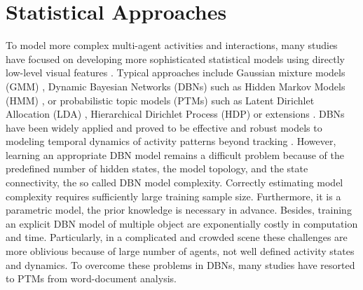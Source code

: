 \section{Statistical Approaches}
\label{related:statistical approaches}

To model more complex multi-agent activities and interactions, many studies have focused on developing more sophisticated statistical models using directly low-level visual features \cite{ zhong2004detecting, duong2005activity, benezeth2009abnormal, kuettel2010s, hospedales2011identifying, saleemi2010scene, wang2009unsupervised, hospedales2012video}. 
Typical approaches include Gaussian mixture models (GMM) \cite{saleemi2010scene}, Dynamic Bayesian Networks (DBNs) \cite{swears2014complex, vo2014stochastic} such as Hidden Markov Models (HMM) \cite{banerjee2014pose}, or probabilistic topic models (PTMs) \cite{kinoshita2014traffic} such as Latent Dirichlet Allocation (LDA) \cite{blei2003latent}, Hierarchical Dirichlet Process (HDP) \cite{teh2006hdp} or extensions \cite{wang2009unsupervised, hospedales2009markov, kuettel2010s}. 
DBNs have been widely applied and proved to be effective and robust models to modeling temporal dynamics of activity patterns beyond tracking \cite{xiang2006beyond, duong2005activity, banerjee2014pose}. However, learning an appropriate DBN model remains a difficult problem because of the predefined number of hidden states, the model topology, and the state connectivity, the so called DBN model complexity. Correctly estimating model complexity requires sufficiently large training sample size. Furthermore, it is a parametric model, the prior knowledge is necessary in advance. %
Besides, training an explicit DBN model of multiple object are exponentially costly in computation and time. Particularly, in a complicated and crowded scene these challenges are more oblivious because of large number of agents, not well defined activity states and dynamics.
To overcome these problems in DBNs, many studies have resorted to PTMs from word-document analysis.


